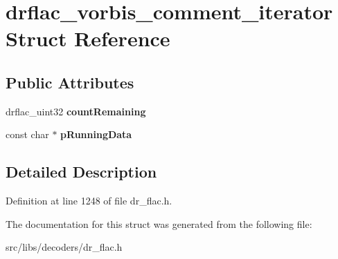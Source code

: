\hypertarget{structdrflac__vorbis__comment__iterator}{\section{drflac\-\_\-vorbis\-\_\-comment\-\_\-iterator Struct Reference}
\label{structdrflac__vorbis__comment__iterator}
}
\subsection*{Public Attributes}
\begin{DoxyCompactItemize}
\item 
\hypertarget{structdrflac__vorbis__comment__iterator_a26b95bb53198ca11ef766cf33feea380}{drflac\-\_\-uint32 {\bfseries count\-Remaining}}\label{structdrflac__vorbis__comment__iterator_a26b95bb53198ca11ef766cf33feea380}

\item 
\hypertarget{structdrflac__vorbis__comment__iterator_abd461d820b3dad5f2e058915d3f04fbe}{const char $\ast$ {\bfseries p\-Running\-Data}}\label{structdrflac__vorbis__comment__iterator_abd461d820b3dad5f2e058915d3f04fbe}

\end{DoxyCompactItemize}


\subsection{Detailed Description}


Definition at line 1248 of file dr\-\_\-flac.\-h.



The documentation for this struct was generated from the following file\-:\begin{DoxyCompactItemize}
\item 
src/libs/decoders/dr\-\_\-flac.\-h\end{DoxyCompactItemize}
